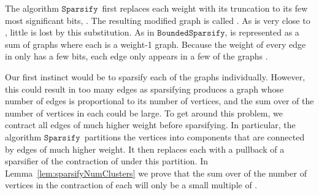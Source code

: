 \documentclass[11pt]{article}
\newcommand{\sparsify}{\ensuremath{\mathtt{Sparsify}}}
\newcommand{\boundedsparsify}{\ensuremath{\mathtt{BoundedSparsify}}}
\begin{document}
The algorithm \sparsify \ first replaces each weight  with
  its truncation to its few most significant bits, .
The resulting modified graph is called .
As  is very close to , little is lost by this substitution.
As in \boundedsparsify ,  is represented as a sum of graphs 
   where each  is a weight-1 graph.
Because the weight of every edge in  only has a few bits,
  each edge only appears in a few of the graphs .

Our first instinct would be to sparsify each of the graphs  individually.
However, this could result in too many edges as sparsifying produces
  a graph whose number of edges is proportional to its number of vertices,
  and the sum over  of the number of vertices in each  could be large.
To get around this problem, we contract all edges of much higher weight
  before sparsifying.
In particular, the algorithm \sparsify \
  partitions the vertices into components that are connected by
  edges of much higher weight.
It then replaces each  with a pullback of a
  sparsifier of the contraction of  under this partition.
In Lemma~\ref{lem:sparsifyNumClusters} we prove that the sum over  of the
  number of vertices in the contraction of each  will only be
  a small multiple of .
\end{document}
